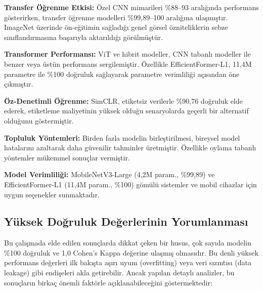 \documentclass[conference]{IEEEtran}
\begin{document}
\textbf{Transfer \"{O}\u{g}renme Etkisi:} \"{O}zel CNN mimarileri \%88--93 aral{\i}\u{g}{\i}nda performans g\"{o}sterirken, transfer \"{o}\u{g}renme modelleri \%99,89--100 aral{\i}\u{g}{\i}na ula\c{s}m{\i}\c{s}t{\i}r. ImageNet \"{u}zerinde \"{o}n-e\u{g}itimin sa\u{g}lad{\i}\u{g}{\i} genel g\"{o}rsel \"{o}zniteliklerin sebze s{\i}n{\i}fland{\i}rmas{\i}na ba\c{s}ar{\i}yla aktar{\i}ld{\i}\u{g}{\i} g\"{o}r\"{u}lm\"{u}\c{s}t\"{u}r.

\textbf{Transformer Performans{\i}:} ViT ve hibrit modeller, CNN tabanlı modeller ile benzer veya \"{u}st\"{u}n performans sergilemi\c{s}tir. \"{O}zellikle EfficientFormer-L1, 11,4M parametre ile \%100 do\u{g}ruluk sa\u{g}layarak parametre verimlili\u{g}i a\c{c}{\i}s{\i}ndan \"{o}ne \c{c}{\i}km{\i}\c{s}t{\i}r.

\textbf{\"{O}z-Denetimli \"{O}\u{g}renme:} SimCLR, etiketsiz verilerle \%90,76 do\u{g}ruluk elde ederek, etiketleme maliyetinin y\"{u}ksek oldu\u{g}u senaryolarda ge\c{c}erli bir alternatif oldu\u{g}unu g\"{o}stermi\c{s}tir.

\textbf{Topluluk Y\"{o}ntemleri:} Birden fazla modelin birle\c{s}tirilmesi, bireysel model hatalar{\i}n{\i} azaltarak daha g\"{u}venilir tahminler \"{u}retmi\c{s}tir. \"{O}zellikle oylama tabanl{\i} y\"{o}ntemler m\"{u}kemmel sonu\c{c}lar vermi\c{s}tir.

\textbf{Model Verimlili\u{g}i:} MobileNetV3-Large (4,2M param., \%99,89) ve EfficientFormer-L1 (11,4M param., \%100) g\"{o}m\"{u}l\"{u} sistemler ve mobil cihazlar i\c{c}in uygun se\c{c}enekler sunmaktad{\i}r.

\subsection{Y\"{u}ksek Do\u{g}ruluk De\u{g}erlerinin Yorumlanmas{\i}}
Bu \c{c}al{\i}\c{s}mada elde edilen sonu\c{c}larda dikkat \c{c}eken bir husus, \c{c}ok say{\i}da modelin \%100 do\u{g}ruluk ve 1,0 Cohen's Kappa de\u{g}erine ula\c{s}m{\i}\c{s} olmas{\i}d{\i}r. Bu denli y\"{u}ksek performans de\u{g}erleri ilk bak{\i}\c{s}ta a\c{s}{\i}r{\i} uyum (overfitting) veya veri s{\i}z{\i}nt{\i}s{\i} (data leakage) gibi endi\c{s}eleri akla getirebilir. Ancak yap{\i}lan detayl{\i} analizler, bu sonu\c{c}lar{\i}n birka\c{c} \"{o}nemli fakt\"{o}rle a\c{c}{\i}klanabilece\u{g}ini g\"{o}stermektedir:
\end{document}
